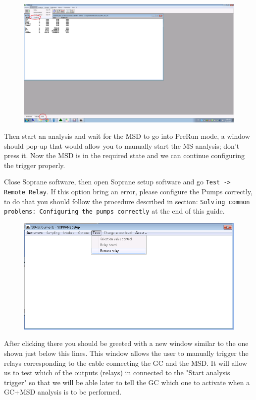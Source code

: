 \documentclass[31pt]{article}
\begin{document}
\begin{figure}[h]
\centering
\includegraphics[width=1.2\textwidth]{4CheckSoprane.png}
\label{fig:univerise}
\end{figure}

Then start an analysis and wait for the MSD to go into PreRun mode, a window should pop-up that would allow you to manually start the MS analysis; don't press it. Now the MSD is in the required state and we can continue configuring the trigger properly.

\newpage

 Close Soprane software, then open Soprane setup software and go \texttt{Test -> Remote Relay}. If this option bring an error, please configure the Pumps correctly, to do that you should follow the procedure described in section: \texttt{Solving common problems: Configuring the pumps correctly} at the end of this guide.

\begin{figure}[h]
\centering
\includegraphics[width=1\textwidth]{5SopraneSetupTest.png}
\label{fig:univerise}
\end{figure}

After clicking there you should be greeted with a new window similar to the one shown just below this lines. This window allows the user to manually trigger the relays corresponding to the cable connecting the GC and the MSD. It will allow us to test which of the outputs (relays) in connected to the "Start analysis trigger" so that we will be able later to tell the GC which one to activate when a GC+MSD analysis is to be performed.
\end{document}

